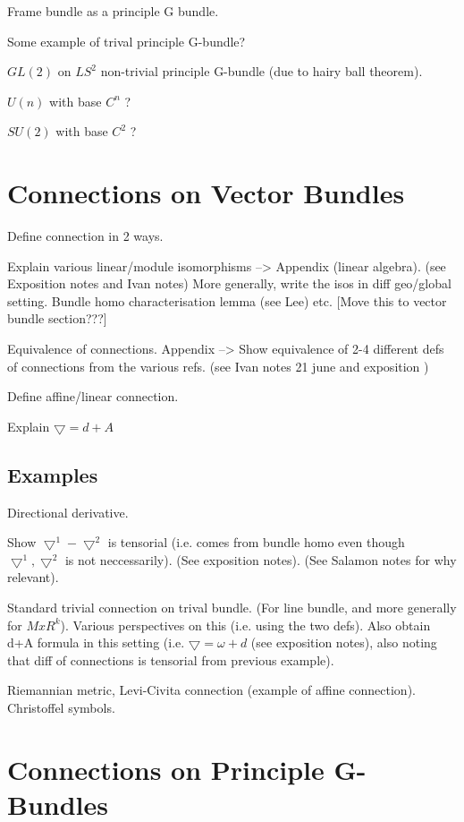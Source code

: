 \documentclass[a4paper]{article}
\theoremstyle{definition} \newtheorem*{definition}{Definition}
\theoremstyle{definition} \newtheorem*{definitions}{Definitions}
\theoremstyle{plain} \newtheorem{theorem}{Theorem}[section]
\theoremstyle{plain} \newtheorem{proposition}[theorem]{Proposition}
\theoremstyle{plain} \newtheorem{corollary}[theorem]{Corollary}
\theoremstyle{plain} \newtheorem{lemma}[theorem]{Lemma}
\theoremstyle{plain} \newtheorem{example}[theorem]{Example}
\begin{document}
Frame bundle as a principle G bundle.

Some example of trival principle G-bundle?

$GL(2)$ on $LS^2$ non-trivial principle G-bundle (due to hairy ball theorem).

$U(n)$ with base $C^n$ ?

$SU(2)$ with base $C^2$ ? 

\section{Connections on Vector Bundles}

Define connection in 2 ways.

Explain various linear/module isomorphisms --> Appendix (linear algebra). (see Exposition notes and Ivan notes)
More generally, write the isos in diff geo/global setting. Bundle homo characterisation lemma (see Lee) etc. [Move this to vector bundle section???] 

Equivalence of connections. 
Appendix --> Show equivalence of 2-4 different defs of connections from the various refs.  (see Ivan notes 21 june and exposition )

Define affine/linear connection.

Explain $\bigtriangledown = d +A$

\subsection{Examples}

Directional derivative.

Show $\bigtriangledown^1 - \bigtriangledown^2$ is tensorial (i.e. comes from bundle homo even though $\bigtriangledown^1,  \bigtriangledown^2$ is not neccessarily). (See exposition notes). (See Salamon notes for why relevant).

Standard trivial connection on trival bundle. (For line bundle, and more generally for $MxR^k$). Various perspectives on this (i.e. using the two defs). Also obtain d+A formula in this setting (i.e. $\bigtriangledown = \omega + d$ (see exposition notes), also noting that diff of connections is tensorial from previous example).

Riemannian metric, Levi-Civita connection (example of affine connection). Christoffel symbols.

\section{Connections on Principle G-Bundles}
\end{document}
